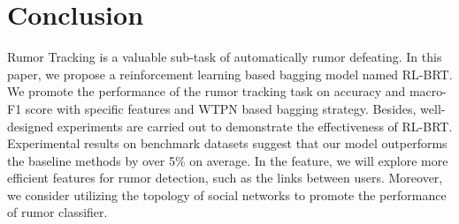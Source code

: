 \section{Conclusion}
\label{sec:conclusion}
Rumor Tracking is a valuable sub-task of automatically rumor defeating. In this paper, we propose a reinforcement learning based bagging model named RL-BRT. We promote the performance of the rumor tracking task on accuracy and macro-F1 score with specific features and WTPN based bagging strategy. Besides, well-designed experiments are carried out to demonstrate the effectiveness of RL-BRT. Experimental results on benchmark datasets suggest that our model outperforms the baseline methods by over 5\% on average. In the feature, we will explore more efficient features for rumor detection, such as the links between users. Moreover, we consider utilizing the topology of social networks to promote the performance of rumor classifier.